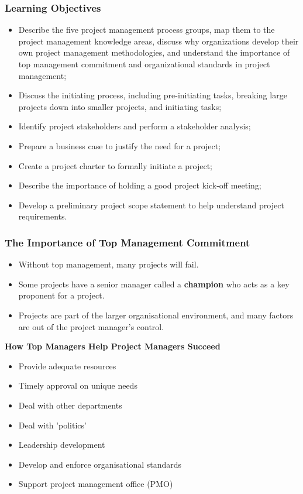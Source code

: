 \documentclass{beamer}
\begin{document}
\begin{frame}
\frametitle{Learning Objectives}
\begin{itemize}
\item Describe the five project management process groups, map them to the project management knowledge areas, discuss why organizations develop their own project management methodologies, and understand the importance of top management commitment and organizational standards in project management;
\item Discuss the initiating process, including pre-initiating tasks, breaking large projects down into smaller projects, and initiating tasks;
\item Identify project stakeholders and perform a stakeholder analysis;
\item Prepare a business case to justify the need for a project;
\item Create a project charter to formally initiate a project;
\item Describe the importance of holding a good project kick-off meeting;
\item Develop a preliminary project scope statement to help understand project requirements.
\end{itemize}

\end{frame}

\begin{frame}
\frametitle{The Importance of Top Management Commitment}
\vspace{-0.1cm}
\begin{itemize}
\item Without top management, many projects will fail.
\item Some projects have a senior manager called a \textbf{champion} who acts as a key proponent for a project.
\item Projects are part of the larger organisational environment, and many factors are out of the project manager's control.
\end{itemize}

\begin{tcolorbox}
\textbf{How Top Managers Help Project Managers Succeed}
\footnotesize
\begin{itemize}
\item Provide adequate resources
\item Timely approval on unique needs
\item Deal with other departments
\item Deal with 'politics'
\item Leadership development
\item Develop and enforce organisational standards
\item Support project management office (PMO)
\end{itemize}
\end{tcolorbox}
\end{frame}
\end{document}
